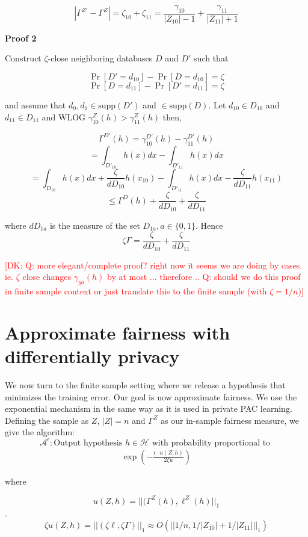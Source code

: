 \documentclass[format = sigconf]{acmart}
\newcommand{\dk}[1]{\textcolor{red}{[DK: #1]}}
\newcommand{\1}{\mathbbm{1}}
\newcommand{\eps}{\epsilon}
\newcommand{\zt}{\zeta}
\newcommand{\z}[1]{Z_{#1}}
\theoremstyle{definition}
\begin{document}
$$|\Gamma^{Z'}- \Gamma^{Z}| = \zt_{10} + \zt_{11}= \frac{\gamma_{10}}{|\z{10}|-1} + \frac{\gamma_{11}}{|Z_{11}|+1} $$

{\bf Proof 2}

Construct $\zt$-close neighboring databases $D$ and $D'$ such that

$$\Pr[D'=d_{10}] - \Pr[D=d_{10}] = \zt$$
$$\Pr[D=d_{11}] - \Pr[D'=d_{11}] = \zt$$



and assume that $d_0, d_1 \in \text{supp}(D')$ and $\in \text{supp}(D)$. Let $d_{10} \in D_{10}$ and $d_{11} \in D_{11}$ and WLOG $\gamma_{10}^Z(h) > \gamma_{11}^Z(h)$ then,

$$\Gamma^{D'}(h) = \gamma_{10}^{D'}(h) - \gamma_{11}^{D'}(h)$$
$$= \int_{D'_{10}}h(x)dx - \int_{D'_{11}}h(x)dx$$
$$= \int_{D_{10}}h(x)dx + \frac{\zt}{dD_{10}}h(x_{10}) - \int_{D'_{11}}h(x)dx - \frac{\zt}{dD_{11}}h(x_{11})$$
$$\leq \Gamma^{D}(h) + \frac{\zt}{dD_{10}} + \frac{\zt}{dD_{11}}$$

where $dD_{1a}$ is the measure of the set $D_{1a}, a \in \{0,1\}$. Hence
$$\zt\Gamma = \frac{\zt}{dD_{10}} + \frac{\zt}{dD_{11}}$$

\dk{Q: more elegant/complete proof? right now it seems we are doing by cases. ie. $\zt$ close changes $\gamma_{ya}(h)$ by at most ... therefore ..
Q: should we do this proof in finite sample context or just translate this to the finite sample (with $\zt = 1/n$)}

\section{Approximate fairness with differentially privacy}



We now turn to the finite sample setting where we release a hypothesis that minimizes the training error. Our goal is now approximate fairness. We use the exponential mechanism in the same way as it is used in private PAC learning. Defining the sample as $Z$, $|Z| = n$ and $\Gamma^{Z}$ as our in-sample fairness measure, we give the algorithm:
$$\mathcal{A}^\eps : \text{Output hypothesis }h \in \mathcal{H} \text{ with probability proportional to }$$
\begin{align}
\exp(-\frac{\eps \cdot u(Z,h)}{2\zt u})
\end{align}

where

$$u(Z,h) = ||(\Gamma^Z(h), \ell^Z(h)||_{1}$$.
$$\zt u(Z,h) = ||(\zt\ell,\zt{\Gamma})||_1 \approx O(||1/n,1/|\z{10}|+1/|Z_{11}|||_1)$$
\end{document}
